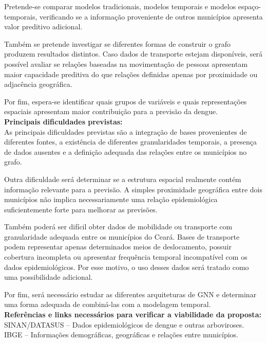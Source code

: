 \documentclass{article}
\begin{document}
Pretende-se comparar modelos tradicionais, modelos temporais e modelos espaço-temporais, verificando se a informação proveniente de outros municípios apresenta valor preditivo adicional.

Também se pretende investigar se diferentes formas de construir o grafo produzem resultados distintos. Caso dados de transporte estejam disponíveis, será possível avaliar se relações baseadas na movimentação de pessoas apresentam maior capacidade preditiva do que relações definidas apenas por proximidade ou adjacência geográfica.

Por fim, espera-se identificar quais grupos de variáveis e quais representações espaciais apresentam maior contribuição para a previsão da dengue. \\

\textbf{Principais dificuldades previstas:} \\
As principais dificuldades previstas são a integração de bases provenientes de diferentes fontes, a existência de diferentes granularidades temporais, a presença de dados ausentes e a definição adequada das relações entre os municípios no grafo.

Outra dificuldade será determinar se a estrutura espacial realmente contém informação relevante para a previsão. A simples proximidade geográfica entre dois municípios não implica necessariamente uma relação epidemiológica suficientemente forte para melhorar as previsões.

Também poderá ser difícil obter dados de mobilidade ou transporte com granularidade adequada entre os municípios do Ceará. Bases de transporte podem representar apenas determinados meios de deslocamento, possuir cobertura incompleta ou apresentar frequência temporal incompatível com os dados epidemiológicos. Por esse motivo, o uso desses dados será tratado como uma possibilidade adicional.

Por fim, será necessário estudar as diferentes arquiteturas de GNN e determinar uma forma adequada de combiná-las com a modelagem temporal. \\

\textbf{Referências e links necessários para verificar a viabilidade da proposta:} \\

SINAN/DATASUS -- Dados epidemiológicos de dengue e outras arboviroses. \\

IBGE -- Informações demográficas, geográficas e relações entre municípios. \\
\end{document}
